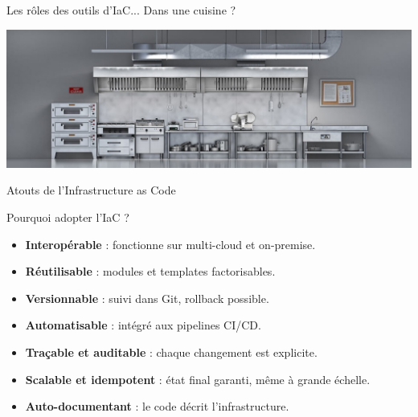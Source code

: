 \documentclass[aspectratio=169,10pt]{beamer}
\begin{document}
\begin{frame}{Les rôles des outils d'IaC... Dans une cuisine ?}

\hspace*{-0.7cm}


\begin{center}
\includegraphics[scale=0.25]{images/Vue-cuisine-3D-face-cuisson-pano-1634649966.jpg}
\end{center}

\end{frame}

\begin{frame}{Atouts de l’Infrastructure as Code}

  \begin{alertblock}{Pourquoi adopter l’IaC ?}
    \begin{itemize}
      \item \textbf{Interopérable} : fonctionne sur multi-cloud et on-premise.
      \item \textbf{Réutilisable} : modules et templates factorisables.
      \item \textbf{Versionnable} : suivi dans Git, rollback possible.
      \item \textbf{Automatisable} : intégré aux pipelines CI/CD.
      \item \textbf{Traçable et auditable} : chaque changement est explicite.
      \item \textbf{Scalable et idempotent} : état final garanti, même à grande échelle.
      \item \textbf{Auto-documentant} : le code décrit l’infrastructure.
    \end{itemize}
  \end{alertblock}

\end{frame}
\end{document}
